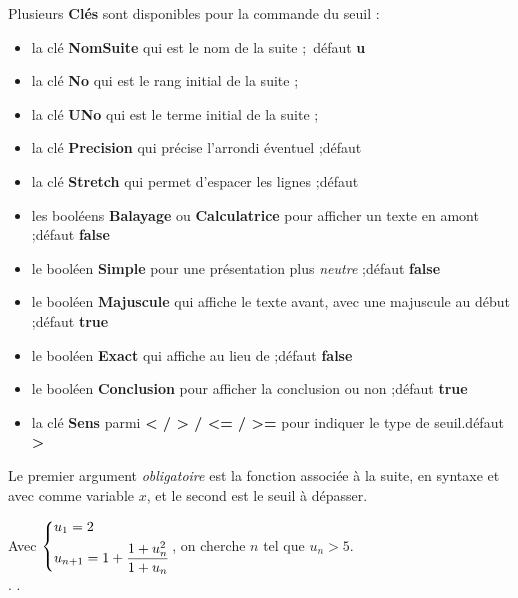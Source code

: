 \documentclass[a4paper,french,11pt]{article}
\newcommand\ctex[1]{\tcbox[vignettelatex]{#1}}
\newcommand\Cle[1]{{\bfseries\sffamily\textlangle #1\textrangle}}
\begin{document}
\begin{cautionblock}
Plusieurs \Cle{Clés} sont disponibles pour la commande du seuil :

\begin{itemize}
	\item la clé \Cle{NomSuite} qui est le nom de la suite ;\hfill~défaut \Cle{u}
	\item la clé \Cle{No} qui est le rang initial de la suite ;
	\item la clé \Cle{UNo} qui est le terme initial de la suite ;
	\item la clé \Cle{Precision} qui précise l'arrondi éventuel ;\hfill{}défaut \Cle{2}
	\item la clé \Cle{Stretch} qui permet d'espacer les lignes ;\hfill{}défaut \Cle{1.15}
	\item les booléens \Cle{Balayage} ou \Cle{Calculatrice} pour afficher un texte en amont ;\hfill{}défaut \Cle{false}
	\item le booléen \Cle{Simple} pour une présentation plus \textit{neutre} ;\hfill{}défaut \Cle{false}
	\item le booléen \Cle{Majuscule} qui affiche le texte avant, avec une majuscule au début ;\hfill{}défaut \Cle{true}
	\item le booléen \Cle{Exact} qui affiche \ctex{=} au lieu de \ctex{\textbackslash approx} ;\hfill{}défaut \Cle{false}
	\item le booléen \Cle{Conclusion} pour afficher la conclusion ou non ;\hfill{}défaut \Cle{true}
	\item la clé \Cle{Sens} parmi \Cle{< / > / <= / >=} pour indiquer le type de seuil.\hfill{}défaut \Cle{>}
\end{itemize}

\smallskip

Le premier argument \textit{obligatoire} est la fonction associée à la suite, en syntaxe \ctex{xint} et avec comme variable $x$, et le second est le seuil à dépasser.
\end{cautionblock}

\begin{PresCodePL}{}
Avec $\begin{dcases} u_1 = 2 \\ u_{n+1}=1+\dfrac{1+u_n^2}{1+u_n} \end{dcases}$,
on cherche $n$ tel que $u_n > 5$.\\
. .
\end{PresCodePL}
\end{document}
